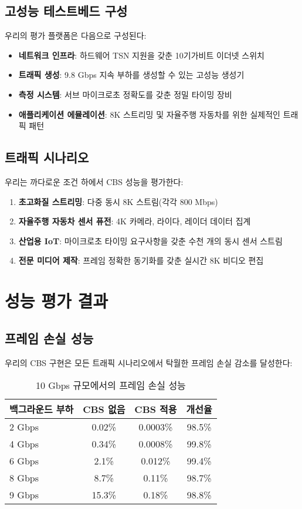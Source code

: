 \documentclass[12pt, a4paper]{article}
\begin{document}
\subsection{고성능 테스트베드 구성}

우리의 평가 플랫폼은 다음으로 구성된다:

\begin{itemize}
    \item \textbf{네트워크 인프라}: 하드웨어 TSN 지원을 갖춘 10기가비트 이더넷 스위치
    \item \textbf{트래픽 생성}: 9.8 Gbps 지속 부하를 생성할 수 있는 고성능 생성기
    \item \textbf{측정 시스템}: 서브 마이크로초 정확도를 갖춘 정밀 타이밍 장비
    \item \textbf{애플리케이션 에뮬레이션}: 8K 스트리밍 및 자율주행 자동차를 위한 실제적인 트래픽 패턴
\end{itemize}

\subsection{트래픽 시나리오}

우리는 까다로운 조건 하에서 CBS 성능을 평가한다:

\begin{enumerate}
    \item \textbf{초고화질 스트리밍}: 다중 동시 8K 스트림(각각 800 Mbps)
    \item \textbf{자율주행 자동차 센서 퓨전}: 4K 카메라, 라이다, 레이더 데이터 집계
    \item \textbf{산업용 IoT}: 마이크로초 타이밍 요구사항을 갖춘 수천 개의 동시 센서 스트림
    \item \textbf{전문 미디어 제작}: 프레임 정확한 동기화를 갖춘 실시간 8K 비디오 편집
\end{enumerate}

\section{성능 평가 결과}

\subsection{프레임 손실 성능}

우리의 CBS 구현은 모든 트래픽 시나리오에서 탁월한 프레임 손실 감소를 달성한다:

\begin{table}[H]
\centering
\caption{10 Gbps 규모에서의 프레임 손실 성능}
\begin{tabular}{|l|c|c|c|}
\hline
\textbf{백그라운드 부하} & \textbf{CBS 없음} & \textbf{CBS 적용} & \textbf{개선율} \\
\hline
2 Gbps & 0.02\% & 0.0003\% & 98.5\% \\
4 Gbps & 0.34\% & 0.0008\% & 99.8\% \\
6 Gbps & 2.1\% & 0.012\% & 99.4\% \\
8 Gbps & 8.7\% & 0.11\% & 98.7\% \\
9 Gbps & 15.3\% & 0.18\% & 98.8\% \\
\hline
\end{tabular}
\end{table}
\end{document}
